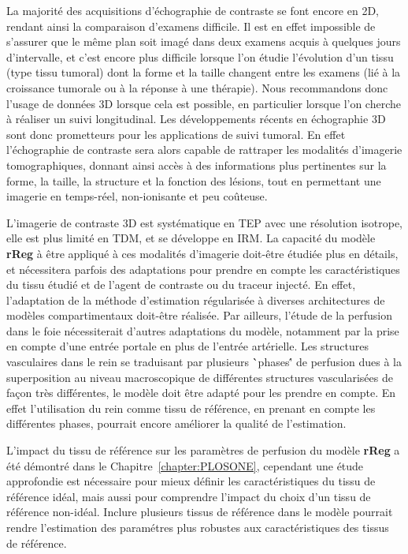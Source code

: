 \begin{otherlanguage}{francais}
La majorit\'e des acquisitions d'\'echographie de contraste se font encore en 2D, rendant ainsi la comparaison d'examens difficile.
Il est en effet impossible de s'assurer que le m\^eme plan soit imag\'e dans deux examens acquis \`a quelques jours d'intervalle, et c'est encore plus difficile lorsque l'on \'etudie l'\'evolution d'un tissu (type tissu tumoral) dont la forme et la taille changent entre les examens (li\'e \`a la croissance tumorale ou \`a la r\'eponse \`a une th\'erapie).
Nous recommandons donc l'usage de donn\'ees 3D lorsque cela est possible, en particulier lorsque l'on cherche \`a r\'ealiser un suivi longitudinal.
Les d\'eveloppements r\'ecents en \'echographie 3D sont donc prometteurs pour les applications de suivi tumoral.
En effet l'\'echographie de contraste sera alors capable de rattraper les modalit\'es d'imagerie tomographiques, donnant ainsi acc\`es \`a des informations plus pertinentes sur la forme, la taille, la structure et la fonction des l\'esions, tout en permettant une imagerie en temps-r\'eel, non-ionisante et peu co\^uteuse.

L'imagerie de contraste 3D est syst\'ematique en TEP avec une r\'esolution isotrope, elle est plus limit\'e en TDM, et se d\'eveloppe en IRM.
La capacit\'e du mod\`ele \textbf{rReg} \`a \^etre appliqu\'e \`a ces modalit\'es d'imagerie doit-\^etre \'etudi\'ee plus en d\'etails, et n\'ecessitera parfois des adaptations pour prendre en compte les caract\'eristiques du tissu \'etudi\'e et de l'agent de contraste ou du traceur inject\'e.
En effet, l'adaptation de la m\'ethode d'estimation r\'egularis\'ee \`a diverses architectures de mod\`eles compartimentaux doit-\^etre r\'ealis\'ee.
Par ailleurs, l'\'etude de la perfusion dans le foie n\'ecessiterait d'autres adaptations du mod\`ele, notamment par la prise en compte d'une entr\'ee portale en plus de l'entr\'ee art\'erielle.
Les structures vasculaires dans le rein se traduisant par plusieurs \``phases\'' de perfusion dues \`a la superposition au niveau macroscopique de diff\'erentes structures vascularis\'ees de fa\c{c}on tr\`es diff\'erentes, le mod\`ele doit \^etre adapt\'e pour les prendre en compte.
En effet l'utilisation du rein comme tissu de r\'ef\'erence, en prenant en compte les diff\'erentes phases, pourrait encore am\'eliorer la qualit\'e de l'estimation.

L'impact du tissu de r\'ef\'erence sur les param\`etres de perfusion du mod\`ele \textbf{rReg} a \'et\'e d\'emontr\'e dans le Chapitre~\ref{chapter:PLOSONE}, cependant une \'etude approfondie est n\'ecessaire pour mieux d\'efinir les caract\'eristiques du tissu de r\'ef\'erence id\'eal, mais aussi pour comprendre l'impact du choix d'un tissu de r\'ef\'erence non-id\'eal.
Inclure plusieurs tissus de r\'ef\'erence dans le mod\`ele pourrait rendre l'estimation des param\'etres plus robustes aux caract\'eristiques des tissus de r\'ef\'erence.


\end{otherlanguage}
